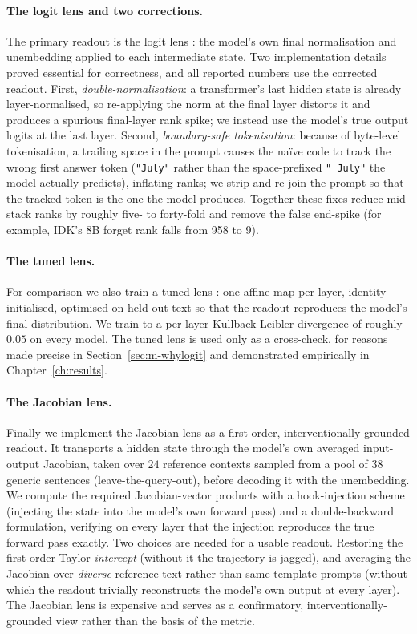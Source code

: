 \paragraph{The logit lens and two corrections.}
The primary readout is the logit lens \citep{nostalgebraist2020logitlens}: the model's own final
normalisation and unembedding applied to each intermediate state. Two implementation details proved
essential for correctness, and all reported numbers use the corrected readout. First,
\emph{double-normalisation}: a transformer's last hidden state is already layer-normalised, so re-applying
the norm at the final layer distorts it and produces a spurious final-layer rank spike; we instead use the
model's true output logits at the last layer. Second, \emph{boundary-safe tokenisation}: because of
byte-level tokenisation, a trailing space in the prompt causes the na\"ive code to track the wrong first
answer token (\texttt{"July"} rather than the space-prefixed \texttt{" July"} the model actually predicts),
inflating ranks; we strip and re-join the prompt so that the tracked token is the one the model produces.
Together these fixes reduce mid-stack ranks by roughly five- to forty-fold and remove the false end-spike
(for example, IDK's 8B forget rank falls from 958 to 9).

\paragraph{The tuned lens.}
For comparison we also train a tuned lens \citep{belrose2023tunedlens}: one affine map per layer,
identity-initialised, optimised on held-out text so that the readout reproduces the model's final
distribution. We train to a per-layer Kullback-Leibler divergence of roughly $0.05$ on every model. The
tuned lens is used only as a cross-check, for reasons made precise in Section~\ref{sec:m-whylogit} and
demonstrated empirically in Chapter~\ref{ch:results}.

\paragraph{The Jacobian lens.}
Finally we implement the Jacobian lens \citep{anthropic2026workspace} as a first-order,
interventionally-grounded readout. It transports a
hidden state through the model's own averaged input-output Jacobian, taken over $24$ reference contexts
sampled from a pool of $38$ generic sentences (leave-the-query-out), before decoding it with the unembedding. We compute the required Jacobian-vector products with a
hook-injection scheme (injecting the state into the model's own forward pass) and a double-backward
formulation, verifying on every layer that the injection reproduces the true forward pass exactly. Two
choices are needed for a usable readout. Restoring the first-order Taylor \emph{intercept} (without it the
trajectory is jagged), and averaging the Jacobian over \emph{diverse} reference text rather than
same-template prompts (without which the readout trivially reconstructs the model's own output at every
layer). The Jacobian lens is expensive and serves as a confirmatory, interventionally-grounded view rather
than the basis of the metric.

